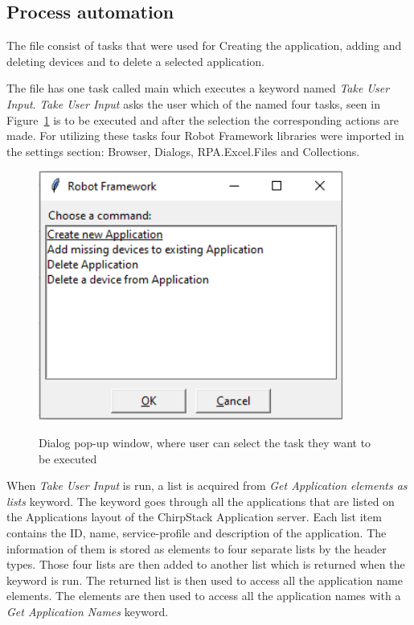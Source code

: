 \subsection{Process automation}
The  file consist of tasks that were used for Creating the application, adding and deleting devices and to delete a selected application.

The file has one task called main which executes a keyword named \textit{Take User Input}.
\textit{Take User Input} asks the user which of the named four tasks, seen in Figure~\ref{fig:user_input_commands} is to be executed and after the selection the corresponding actions are made.
For utilizing these tasks four Robot Framework libraries were imported in the settings section: Browser, Dialogs, RPA.Excel.Files and Collections.

\clearpage

\begin{figure}[ht]
  \centering
  {\includegraphics[width=10cm]{illustration/take_user_input_dialog.PNG}}
  \caption{Dialog pop-up window, where user can select the task they want to be executed}
  \label{fig:user_input_commands}
\end{figure}

When \textit{Take User Input} is run, a list is acquired from \textit{Get Application elements as lists} keyword.
The keyword goes through all the applications that are listed on the Applications layout of the ChirpStack Application server.
Each list item contains the ID, name, service-profile and description of the application.
The information of them is stored as elements to four separate lists by the header types.
Those four lists are then added to another list which is returned when the keyword is run.
The returned list is then used to access all the application name elements.
The elements are then used to access all the application names with a \textit{Get Application Names} keyword.

